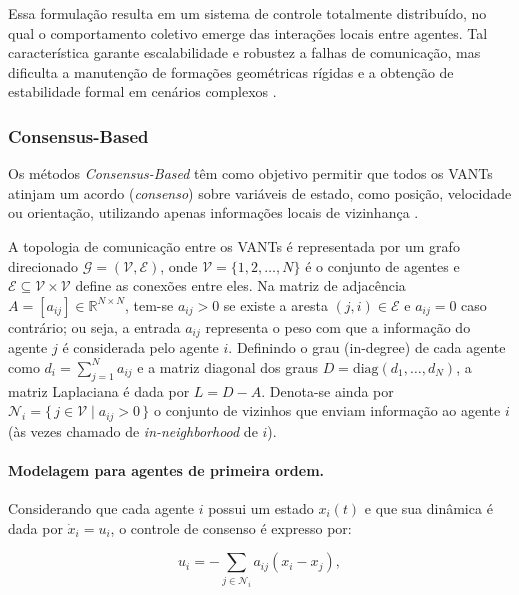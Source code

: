 Essa formulação resulta em um sistema de controle totalmente distribuído, no qual o comportamento coletivo emerge das interações locais entre agentes. Tal característica garante escalabilidade e robustez a falhas de comunicação, mas dificulta a manutenção de formações geométricas rígidas e a obtenção de estabilidade formal em cenários complexos \citep{bu2024advancement, ouyang2023formation}.

\subsubsection{Consensus-Based}

Os métodos \textit{Consensus-Based} têm como objetivo permitir que todos os VANTs atinjam um acordo (\textit{consenso}) sobre variáveis de estado, como posição, velocidade ou orientação, utilizando apenas informações locais de vizinhança \citep{bu2024advancement, ouyang2023formation, olfati2007consensus, ren2008distributed}. 

A topologia de comunicação entre os VANTs é representada por um grafo direcionado \(\mathcal{G} = (\mathcal{V}, \mathcal{E})\), onde \(\mathcal{V} = \{1, 2, \dots, N\}\) é o conjunto de agentes e \(\mathcal{E} \subseteq \mathcal{V} \times \mathcal{V}\) define as conexões entre eles. Na matriz de adjacência \(A = [a_{ij}]\in\mathbb{R}^{N\times N}\), tem-se \(a_{ij} > 0\) se existe a aresta \((j,i)\in\mathcal{E}\) e \(a_{ij} = 0\) caso contrário; ou seja, a entrada \(a_{ij}\) representa o peso com que a informação do agente \(j\) é considerada pelo agente \(i\). Definindo o grau (in-degree) de cada agente como \(d_i = \sum_{j=1}^{N} a_{ij}\) e a matriz diagonal dos graus \(D=\mathrm{diag}(d_1,\dots,d_N)\), a matriz Laplaciana é dada por \(L = D - A\). Denota-se ainda por \(\mathcal{N}_i = \{\, j \in \mathcal{V} \mid a_{ij} > 0 \,\}\) o conjunto de vizinhos que enviam informação ao agente \(i\) (às vezes chamado de \emph{in-neighborhood} de \(i\)).

\paragraph{Modelagem para agentes de primeira ordem.}
Considerando que cada agente \(i\) possui um estado \(x_i(t)\) e que sua dinâmica é dada por \(\dot{x}_i = u_i\), o controle de consenso é expresso por:

\begin{equation}
u_i = -\sum_{j \in \mathcal{N}_i} a_{ij} (x_i - x_j),
\end{equation}


